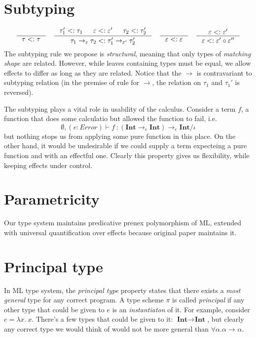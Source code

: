 \documentclass[declaration,shortabstract]{iithesis}
\theoremstyle{definition} \newtheorem{definition}{Definition}[section]
\newcommand{\types}[4][\Gamma;\Theta]{\ensuremath{{{#1} \vdash {#2} \: : {#3}/{#4}}}}
\newcommand{\arrow}[3]{{#1}\rightarrow_{#2}{#3}}
\newcommand{\lam}[1][x]{\ensuremath{\lambda #1.\:}}
\begin{document}
\section{Subtyping}
\begin{gather*}
\begin{gathered}
\inference{}{\tau <: \tau}
\quad
\inference{
    \tau_1' <: \tau_1 & \varepsilon <: \varepsilon' & \tau_2 <: \tau_2'
}{
    \arrow{\tau_1}{\varepsilon}{\tau_2} <: \arrow{\tau_1'}{\varepsilon'}{\tau_2'}
} 
\quad
\inference{}{\varepsilon <: \varepsilon}
\quad
\inference{
    \varepsilon <: \varepsilon'
}{
    \varepsilon <: \varepsilon' \circ \varepsilon''
}
\end{gathered}
\end{gather*}
\setlength{\jot}{3pt}
The subtyping rule we propose is \textit{structural}, meaning that only types of
\textit{matching shape} are related.
However, while leaves containing types must be equal, we allow effects to differ as long as they are related.
Notice that the $\rightarrow$ is contravariant to subtyping relation
(in the premise of rule for $\rightarrow$, the relation on $\tau_1$ and $\tau_1'$ is reversed).

The subtyping plays a vital role in usability of the calculus.
Consider a term $f$, a function that does some calculatio
but allowed the function to fail, i.e.
$$
\types[\emptyset, (e: Error)]
    {f}
    {\arrow{(\arrow{\textbf{Int}}{e}{\textbf{Int}})}{e}{\textbf{Int}}}
    {\iota}
$$
but nothing stops us from applying some pure function in this place.
On the other hand, it would be undesirable if we could supply a term expecteing
a pure function and with an effectful one.
Clearly this property gives us flexibility, while keeping effects under control.


\section{Parametricity}
Our type system maintains predicative prenex polymorphism of ML,
extended with universal quantification over effects because original paper maintains it.


\section{Principal type}
In ML type system, the \textit{principal type} property states that there exists
a \textit{most general} type for any correct program\cite{principal}. 
A type scheme $\pi$ is called \textit{principal} if any other type that
could be given to $e$ is an \textit{instantiaton} of it.
For example, consider $e = \lam x$.
There's a few types that could be given to it: $\arrow{\textbf{Int}}{}{\textbf{Int}}$, 
but clearly any correct type we would think of would not be more general than $\forall \alpha . \arrow{\alpha}{}{\alpha}$.
\end{document}
